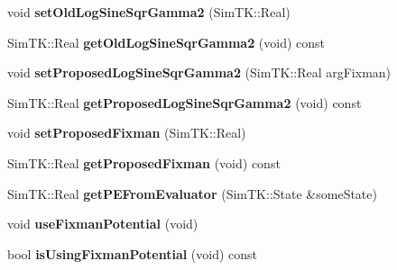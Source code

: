\begin{DoxyCompactItemize}
\item 
void {\bfseries set\+Old\+Log\+Sine\+Sqr\+Gamma2} (Sim\+T\+K\+::\+Real)\hypertarget{classMonteCarloSampler_a78930927d4a5b5d201f38cdd5e438f88}{}\label{classMonteCarloSampler_a78930927d4a5b5d201f38cdd5e438f88}

\item 
Sim\+T\+K\+::\+Real {\bfseries get\+Old\+Log\+Sine\+Sqr\+Gamma2} (void) const \hypertarget{classMonteCarloSampler_a3120cbf9c30baff5a64f02f38767472b}{}\label{classMonteCarloSampler_a3120cbf9c30baff5a64f02f38767472b}

\item 
void {\bfseries set\+Proposed\+Log\+Sine\+Sqr\+Gamma2} (Sim\+T\+K\+::\+Real arg\+Fixman)\hypertarget{classMonteCarloSampler_aee0045dca052c0a485c36175a1818e77}{}\label{classMonteCarloSampler_aee0045dca052c0a485c36175a1818e77}

\item 
Sim\+T\+K\+::\+Real {\bfseries get\+Proposed\+Log\+Sine\+Sqr\+Gamma2} (void) const \hypertarget{classMonteCarloSampler_af3dc14be70f4a1fc565e557633932db1}{}\label{classMonteCarloSampler_af3dc14be70f4a1fc565e557633932db1}

\item 
void {\bfseries set\+Proposed\+Fixman} (Sim\+T\+K\+::\+Real)\hypertarget{classMonteCarloSampler_a8b36193b2d296fc2f3b3dd2c56e41aa9}{}\label{classMonteCarloSampler_a8b36193b2d296fc2f3b3dd2c56e41aa9}

\item 
Sim\+T\+K\+::\+Real {\bfseries get\+Proposed\+Fixman} (void) const \hypertarget{classMonteCarloSampler_aa2e8b879e996bd6f9b226657d3ed3a63}{}\label{classMonteCarloSampler_aa2e8b879e996bd6f9b226657d3ed3a63}

\item 
Sim\+T\+K\+::\+Real {\bfseries get\+P\+E\+From\+Evaluator} (Sim\+T\+K\+::\+State \&some\+State)\hypertarget{classMonteCarloSampler_af535395968c8aedfcb98836f61a0594f}{}\label{classMonteCarloSampler_af535395968c8aedfcb98836f61a0594f}

\item 
void {\bfseries use\+Fixman\+Potential} (void)\hypertarget{classMonteCarloSampler_a8f47fe7010dd8c087e386af08e6b17bf}{}\label{classMonteCarloSampler_a8f47fe7010dd8c087e386af08e6b17bf}

\item 
bool {\bfseries is\+Using\+Fixman\+Potential} (void) const \hypertarget{classMonteCarloSampler_a16b691acfbbb0489b79949053610adea}{}\label{classMonteCarloSampler_a16b691acfbbb0489b79949053610adea}


\end{DoxyCompactItemize}
